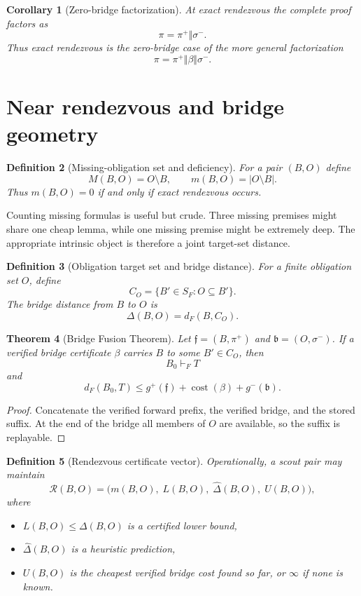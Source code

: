 \documentclass[11pt]{article}
\newtheorem{definition}{Definition}[section]
\newtheorem{theorem}[definition]{Theorem}
\newtheorem{corollary}[definition]{Corollary}
\newcommand{\cost}{\operatorname{cost}}
\begin{document}
\begin{corollary}[Zero-bridge factorization]
At exact rendezvous the complete proof factors as
\[
\pi=\pi^+\Vert\sigma^-.
\]
Thus exact rendezvous is the zero-bridge case of the more general factorization
\[
\pi=\pi^+\Vert\beta\Vert\sigma^-.
\]
\end{corollary}

\section{Near rendezvous and bridge geometry}

\begin{definition}[Missing-obligation set and deficiency]
For a pair $(B,O)$ define
\[
M(B,O)=O\setminus B,
\qquad
m(B,O)=|O\setminus B|.
\]
Thus $m(B,O)=0$ if and only if exact rendezvous occurs.
\end{definition}

Counting missing formulas is useful but crude. Three missing premises might share one cheap lemma, while one missing premise might be extremely deep. The appropriate intrinsic object is therefore a joint target-set distance.

\begin{definition}[Obligation target set and bridge distance]
For a finite obligation set $O$, define
\[
C_O=\{B'\in S_F:O\subseteq B'\}.
\]
The bridge distance from $B$ to $O$ is
\[
\Delta(B,O)=d_F(B,C_O).
\]
\end{definition}

\begin{theorem}[Bridge Fusion Theorem]
Let $\mathfrak f=(B,\pi^+)$ and $\mathfrak b=(O,\sigma^-)$. If a verified bridge certificate $\beta$ carries $B$ to some $B'\in C_O$, then
\[
B_0\vdash_F T
\]
and
\[
d_F(B_0,T)\le g^+(\mathfrak f)+\cost(\beta)+g^-(\mathfrak b).
\]
\end{theorem}

\begin{proof}
Concatenate the verified forward prefix, the verified bridge, and the stored suffix. At the end of the bridge all members of $O$ are available, so the suffix is replayable.
\end{proof}

\begin{definition}[Rendezvous certificate vector]
Operationally, a scout pair may maintain
\[
\mathcal R(B,O)=\bigl(m(B,O),\;L(B,O),\;\widehat\Delta(B,O),\;U(B,O)\bigr),
\]
where
\begin{itemize}[nosep]
\item $L(B,O)\le\Delta(B,O)$ is a certified lower bound,
\item $\widehat\Delta(B,O)$ is a heuristic prediction,
\item $U(B,O)$ is the cheapest verified bridge cost found so far, or $\infty$ if none is known.
\end{itemize}
\end{definition}
\end{document}
